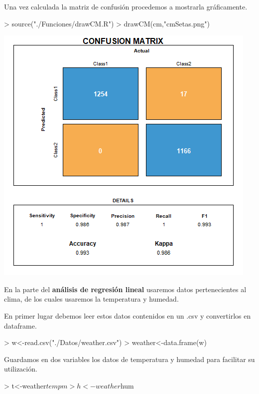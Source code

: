 \documentclass [a4paper] {article}
\begin{document}
\bigskip
Una vez calculada la matriz de confusión procedemos a mostrarla gráficamente.
\begin{Schunk}
\begin{Sinput}
> source("./Funciones/drawCM.R")
> drawCM(cm,"cmSetas.png")
\end{Sinput}
\end{Schunk}
\includegraphics[width=\textwidth]{cmSetas}

\bigskip
En la parte del \textbf{análisis de regresión lineal} usaremos datos pertenecientes al clima, de los cuales usaremos la 
temperatura y humedad.

\bigskip
En primer lugar debemos leer estos datos contenidos en un .csv y convertirlos en dataframe.
\begin{Schunk}
\begin{Sinput}
> w<-read.csv("./Datos/weather.csv")
> weather<-data.frame(w)
\end{Sinput}
\end{Schunk}

\bigskip
Guardamos en dos variables los datos de temperatura y humedad para facilitar su utilización.
\begin{Schunk}
\begin{Sinput}
> t<-weather$tempm
> h<-weather$hum
\end{Sinput}
\end{Schunk}
\end{document}
